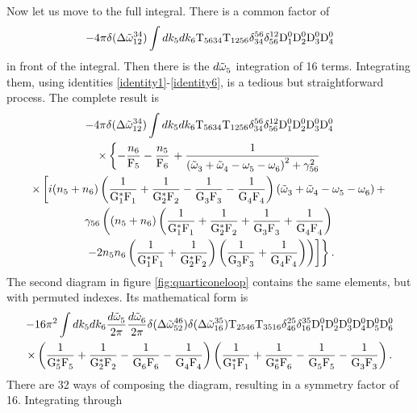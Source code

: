 Now let us move to the full integral. There is a common factor of
\begin{equation*}
    -4\pi\delta(\Delta{\tilde{\omega}}^{34}_{12})\int dk_5 dk_6 \mathrm{T}_{5634}\mathrm{T}_{1256}\delta^{56}_{34}
    \delta^{12}_{56}\mathrm{D}_1^0\mathrm{D}_2^0\mathrm{D}_3^0\mathrm{D}_4^0
\end{equation*}
in front of the integral. Then there is the $d\tilde{\omega}^{}_5$ integration of 16 terms. Integrating them, using identities \eqref{identity1}-\eqref{identity6},
is a tedious but straightforward process. The complete result is 
\begin{multline}
    \small
    -4\pi\delta(\Delta{\tilde{\omega}}^{34}_{12})\int dk_5 dk_6\mathrm{T}_{5634}\mathrm{T}_{1256}\delta^{56}_{34}
    \delta^{12}_{56}\mathrm{D}_1^0\mathrm{D}_2^0\mathrm{D}_3^0\mathrm{D}_4^0 \\
    \times \left\{ -\frac{n_6}{\mathrm{F}_5}-\frac{n_5}{\mathrm{F}_6}\right. + 
    \frac{1}{\left( \tilde{\omega}^{}_3 + \tilde{\omega}^{}_4 - \omega^{}_5 - \omega^{}_6\right)^2 + \gamma^2_{56}}\\
    \times \left[
    i(n_5 + n_6)\left(\dfrac{1}{\mathrm{G}_1^*\mathrm{F}_1^{}}+\dfrac{1}{\mathrm{G}_2^*\mathrm{F}_2^{}}-\dfrac{1}{\mathrm{G}_3^{}\mathrm{F}_3^{}}
    -\dfrac{1}{\mathrm{G}_4^{}\mathrm{F}_4^{}}\right)\left( \tilde{\omega}^{}_3 + \tilde{\omega}^{}_4 - \omega^{}_5 - \omega^{}_6\right) + 
    \right.\\
    \gamma_{56}\left((n_5 + n_6)\left(\dfrac{1}{\mathrm{G}_1^*\mathrm{F}_1^{}}+\dfrac{1}{\mathrm{G}_2^*\mathrm{F}_2^{}}+\dfrac{1}{\mathrm{G}_3^{}\mathrm{F}_3^{}}
    +\dfrac{1}{\mathrm{G}_4^{}\mathrm{F}_4^{}}\right) \right. \\
    \left. \left. \left.- 2n_5n_6 \left(\dfrac{1}{\mathrm{G}_1^*\mathrm{F}_1^{}}+\dfrac{1}{\mathrm{G}_2^*\mathrm{F}_2^{}}\right)\left(\dfrac{1}{\mathrm{G}_3^{}\mathrm{F}_3^{}}
    +\dfrac{1}{\mathrm{G}_4^{}\mathrm{F}_4^{}}\right)\right)
    \right]\right\}.
    \label{schannelfullcontribution}
\end{multline}
The second diagram in figure \ref{fig:quarticoneloop} contains the same elements, but with permuted indexes. Its mathematical form is 
\begin{multline}
    -16\pi^2\int dk_5 dk_6\frac{d\tilde{\omega}^{}_5}{2\pi}\frac{d\tilde{\omega}^{}_6}{2\pi}\delta(\Delta{\tilde{\omega}}^{46}_{52})\delta(\Delta{\tilde{\omega}}^{35}_{16})\mathrm{T}_{2546}\mathrm{T}_{3516}\delta^{25}_{46}
    \delta^{35}_{16}\mathrm{D}_1^0\mathrm{D}_2^0\mathrm{D}_3^0\mathrm{D}_4^0\mathrm{D}_5^0\mathrm{D}_6^0 \\ 
    \times \left(\dfrac{1}{\mathrm{G}_5^*\mathrm{F}_5^{}}+\dfrac{1}{\mathrm{G}_2^*\mathrm{F}_2^{}}-\dfrac{1}{\mathrm{G}_6^{}\mathrm{F}_6^{}}
    -\dfrac{1}{\mathrm{G}_4^{}\mathrm{F}_4^{}}\right)\left(\dfrac{1}{\mathrm{G}_1^*\mathrm{F}_1^{}}+\dfrac{1}{\mathrm{G}_6^*\mathrm{F}_6^{}}-\dfrac{1}{\mathrm{G}_5^{}\mathrm{F}_5^{}}
    -\dfrac{1}{\mathrm{G}_3^{}\mathrm{F}_3^{}}\right).
    \label{tchannel}
\end{multline}
There are 32 ways of composing the diagram, resulting in a symmetry factor of 16. Integrating through 
